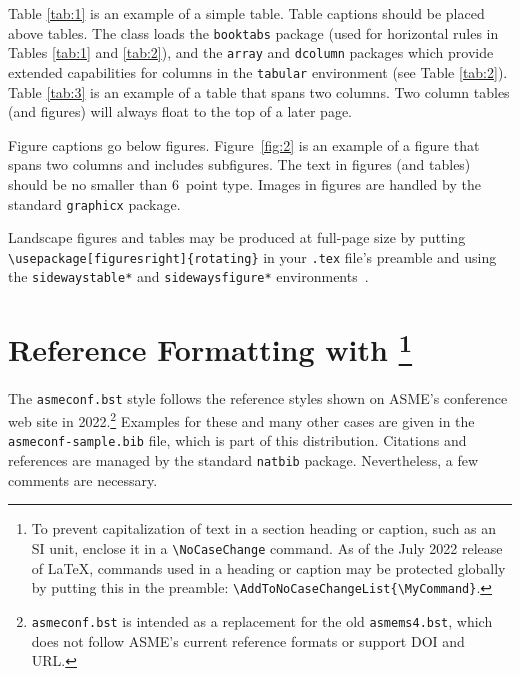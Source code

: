 \documentclass[balance,upint,subscriptcorrection,varvw,mathalfa=cal=boondoxo,spanish,french,vietnamese,russian,greek,pdf-a,fontspec,colorlinks]{asmeconf}
\begin{document}
Table \ref{tab:1} is an example of a simple table. Table captions should be placed above tables.
The class loads the \texttt{booktabs} package (used for horizontal rules in Tables \ref{tab:1} and \ref{tab:2}), and the \texttt{array} and \texttt{dcolumn} packages which provide extended capabilities for columns in the \texttt{tabular} environment (see Table \ref{tab:2}).  Table \ref{tab:3} is an example of a table that spans two columns. Two column tables (and figures) will always float to the top of a later page.

Figure captions go below figures. Figure~\ref{fig:2} is an example of a figure that spans two columns and includes subfigures. The text in figures (and tables) should be no smaller than 6~point type. Images in figures are handled by the standard \texttt{graphicx} package.

Landscape figures and tables may be produced at full-page size by putting \verb|\usepackage[figuresright]{rotating}| in your \texttt{.tex} file's preamble and using the \texttt{sidewaystable*} and \texttt{sidewaysfigure*} environments~\cite{fairbairns}.



\section{Reference Formatting with \footnote{To prevent capitalization of text in a section heading or caption, such as an SI unit, enclose it in a \texttt{\textbackslash NoCaseChange} command. As of the July 2022 release of \LaTeX, commands used in a heading or caption may be protected globally by putting this in the preamble: \texttt{\textbackslash AddToNoCaseChangeList\{\textbackslash MyCommand\}}.}}\label{sec:references}

The {\upshape\texttt{asmeconf.bst}}   style follows the reference styles shown on ASME's conference web site in  2022.\footnote{\texttt{asmeconf.bst} is intended as a replacement for the old \texttt{asmems4.bst}, which does not follow ASME's current reference formats or support DOI and URL.}
Examples for these and many other cases are given in the \texttt{asmeconf-sample.bib} file, which is part of this distribution. Citations and references are managed by the standard \texttt{natbib} package.  Nevertheless, a few comments are necessary. 

\end{document}
